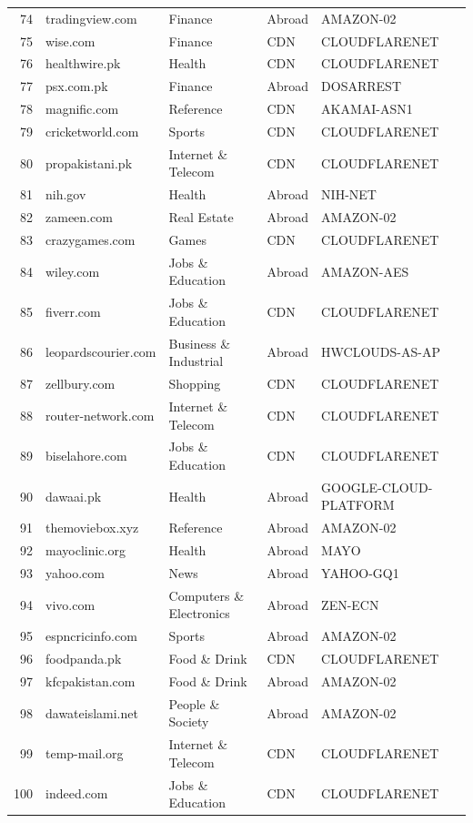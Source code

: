 \documentclass{article}
\begin{document}
\begin{longtable}{r l l l l}
74 & tradingview.com & Finance & Abroad & AMAZON-02 \\
75 & wise.com & Finance & CDN & CLOUDFLARENET \\
76 & healthwire.pk & Health & CDN & CLOUDFLARENET \\
77 & psx.com.pk & Finance & Abroad & DOSARREST \\
78 & magnific.com & Reference & CDN & AKAMAI-ASN1 \\
79 & cricketworld.com & Sports & CDN & CLOUDFLARENET \\
80 & propakistani.pk & Internet \& Telecom & CDN & CLOUDFLARENET \\
81 & nih.gov & Health & Abroad & NIH-NET \\
82 & zameen.com & Real Estate & Abroad & AMAZON-02 \\
83 & crazygames.com & Games & CDN & CLOUDFLARENET \\
84 & wiley.com & Jobs \& Education & Abroad & AMAZON-AES \\
85 & fiverr.com & Jobs \& Education & CDN & CLOUDFLARENET \\
86 & leopardscourier.com & Business \& Industrial & Abroad & HWCLOUDS-AS-AP \\
87 & zellbury.com & Shopping & CDN & CLOUDFLARENET \\
88 & router-network.com & Internet \& Telecom & CDN & CLOUDFLARENET \\
89 & biselahore.com & Jobs \& Education & CDN & CLOUDFLARENET \\
90 & dawaai.pk & Health & Abroad & GOOGLE-CLOUD-PLATFORM \\
91 & themoviebox.xyz & Reference & Abroad & AMAZON-02 \\
92 & mayoclinic.org & Health & Abroad & MAYO \\
93 & yahoo.com & News & Abroad & YAHOO-GQ1 \\
94 & vivo.com & Computers \& Electronics & Abroad & ZEN-ECN \\
95 & espncricinfo.com & Sports & Abroad & AMAZON-02 \\
96 & foodpanda.pk & Food \& Drink & CDN & CLOUDFLARENET \\
97 & kfcpakistan.com & Food \& Drink & Abroad & AMAZON-02 \\
98 & dawateislami.net & People \& Society & Abroad & AMAZON-02 \\
99 & temp-mail.org & Internet \& Telecom & CDN & CLOUDFLARENET \\
100 & indeed.com & Jobs \& Education & CDN & CLOUDFLARENET \\
\end{longtable}
\end{document}

